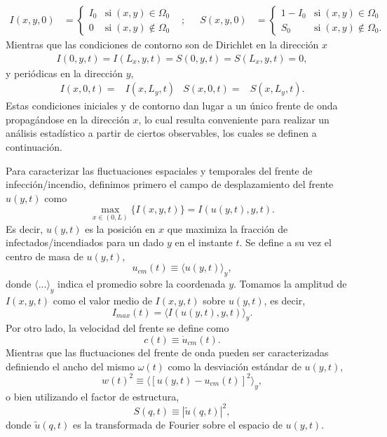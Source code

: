 \begin{align*}
  I(x,y,0) &= 
  \begin{cases}
  I_0 & \text{si} \; (x,y) \in \Omega_0 \\
  0 & \text{si} \; (x,y) \notin \Omega_0  
  \end{cases}
  & ;&&
  S(x,y,0) &=
  \begin{cases}
  1-I_0 & \text{si} \; (x,y) \in \Omega_0 \\
  S_0 & \text{si} \; (x,y) \notin \Omega_0.
  \end{cases}
\end{align*}
Mientras que las condiciones de contorno son de Dirichlet en la dirección $x$
\begin{align*}
  I(0,y,t)=I(L_x,y,t)=S(0,y,t)=S(L_x,y,t)=0,
\end{align*}
y periódicas en la dirección $y$, 
\begin{align*}
  I(x,0,t)=&I(x,L_y,t) & S(x,0,t)=&S(x,L_y,t). 
\end{align*}
Estas condiciones iniciales y de contorno dan lugar a un único frente de onda propagándose en la dirección $x$, lo cual resulta conveniente para realizar un análisis 
estadístico a partir de ciertos observables, los cuales se definen a continuación.

Para caracterizar las fluctuaciones espaciales y temporales del frente de infección/incendio, definimos primero el campo de desplazamiento del frente $u(y,t)$ como
\begin{equation}
  \max_{x\in(0,L)}\{I(x,y,t)\}=I(u(y,t),y,t).\label{campo}
\end{equation}
Es decir, $u(y,t)$ es la posición en $x$ que maximiza la fracción de infectados/incendiados para un dado $y$ en el instante $t$. Se define a su vez el centro de masa
de $u(y,t)$,
\begin{equation}
  u_{cm}(t)\equiv\langle u(y,t)\rangle_{y},\label{centromasa}
\end{equation}
donde $\langle...\rangle_{y}$ indica el promedio sobre la coordenada $y$. Tomamos la amplitud de $I(x,y,t)$ como el valor medio de $I(x,y,t)$ sobre $u(y,t)$, es decir,
\begin{equation}
  I_{max}(t)=\langle I(u(y,t),y,t)\rangle_{y}.\label{maximo}
\end{equation}
Por otro lado, la velocidad del frente se define como
\begin{equation}
  c(t)\equiv\dot{u}_{cm}(t).\label{velocidad}
\end{equation}
Mientras que las fluctuaciones del frente de onda pueden ser caracterizadas definiendo el ancho del mismo $\omega(t)$ como la desviación estándar de $u(y,t)$,
\begin{equation}
  w(t)^2\equiv\langle[u(y,t)-u_{cm}(t)]^2\rangle_{y},\label{rugosidad}
\end{equation}  
o bien utilizando el factor de estructura,
\begin{equation}
  S(q,t)\equiv|\tilde{u}(q,t)|^2,\label{factor}
\end{equation}
donde $\tilde{u}(q,t)$ es la transformada de Fourier sobre el espacio de $u(y,t)$.

